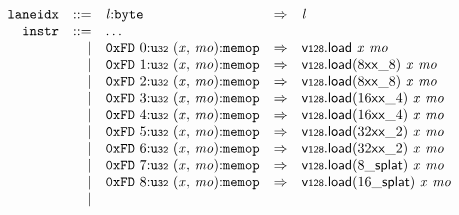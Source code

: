 \vspace{1ex}

$$
\begin{array}{@{}l@{}rrlll@{}l@{}}
& {\mathtt{laneidx}} &::=& {\mathit{l}}{:}{\mathtt{byte}} &\Rightarrow& {\mathit{l}} \\
& {\mathtt{instr}} &::=& \dots \\ &&|&
\mathtt{0xFD}~0{:}{\mathtt{u{\scriptstyle32}}}~({\mathit{x}},\, {\mathit{mo}}){:}{\mathtt{memop}} &\Rightarrow& \mathsf{v{\scriptstyle128}.load}~{\mathit{x}}~{\mathit{mo}} \\ &&|&
\mathtt{0xFD}~1{:}{\mathtt{u{\scriptstyle32}}}~({\mathit{x}},\, {\mathit{mo}}){:}{\mathtt{memop}} &\Rightarrow& {\mathsf{v{\scriptstyle128}.load}}{({{{{8}{\mathsf{x}}}{\mathsf{x}}}{\mathsf{\_}}}{8})}~{\mathit{x}}~{\mathit{mo}} \\ &&|&
\mathtt{0xFD}~2{:}{\mathtt{u{\scriptstyle32}}}~({\mathit{x}},\, {\mathit{mo}}){:}{\mathtt{memop}} &\Rightarrow& {\mathsf{v{\scriptstyle128}.load}}{({{{{8}{\mathsf{x}}}{\mathsf{x}}}{\mathsf{\_}}}{8})}~{\mathit{x}}~{\mathit{mo}} \\ &&|&
\mathtt{0xFD}~3{:}{\mathtt{u{\scriptstyle32}}}~({\mathit{x}},\, {\mathit{mo}}){:}{\mathtt{memop}} &\Rightarrow& {\mathsf{v{\scriptstyle128}.load}}{({{{{16}{\mathsf{x}}}{\mathsf{x}}}{\mathsf{\_}}}{4})}~{\mathit{x}}~{\mathit{mo}} \\ &&|&
\mathtt{0xFD}~4{:}{\mathtt{u{\scriptstyle32}}}~({\mathit{x}},\, {\mathit{mo}}){:}{\mathtt{memop}} &\Rightarrow& {\mathsf{v{\scriptstyle128}.load}}{({{{{16}{\mathsf{x}}}{\mathsf{x}}}{\mathsf{\_}}}{4})}~{\mathit{x}}~{\mathit{mo}} \\ &&|&
\mathtt{0xFD}~5{:}{\mathtt{u{\scriptstyle32}}}~({\mathit{x}},\, {\mathit{mo}}){:}{\mathtt{memop}} &\Rightarrow& {\mathsf{v{\scriptstyle128}.load}}{({{{{32}{\mathsf{x}}}{\mathsf{x}}}{\mathsf{\_}}}{2})}~{\mathit{x}}~{\mathit{mo}} \\ &&|&
\mathtt{0xFD}~6{:}{\mathtt{u{\scriptstyle32}}}~({\mathit{x}},\, {\mathit{mo}}){:}{\mathtt{memop}} &\Rightarrow& {\mathsf{v{\scriptstyle128}.load}}{({{{{32}{\mathsf{x}}}{\mathsf{x}}}{\mathsf{\_}}}{2})}~{\mathit{x}}~{\mathit{mo}} \\ &&|&
\mathtt{0xFD}~7{:}{\mathtt{u{\scriptstyle32}}}~({\mathit{x}},\, {\mathit{mo}}){:}{\mathtt{memop}} &\Rightarrow& {\mathsf{v{\scriptstyle128}.load}}{({{8}{\mathsf{\_}}}{\mathsf{splat}})}~{\mathit{x}}~{\mathit{mo}} \\ &&|&
\mathtt{0xFD}~8{:}{\mathtt{u{\scriptstyle32}}}~({\mathit{x}},\, {\mathit{mo}}){:}{\mathtt{memop}} &\Rightarrow& {\mathsf{v{\scriptstyle128}.load}}{({{16}{\mathsf{\_}}}{\mathsf{splat}})}~{\mathit{x}}~{\mathit{mo}} \\ &&|&

\end{array}$$

